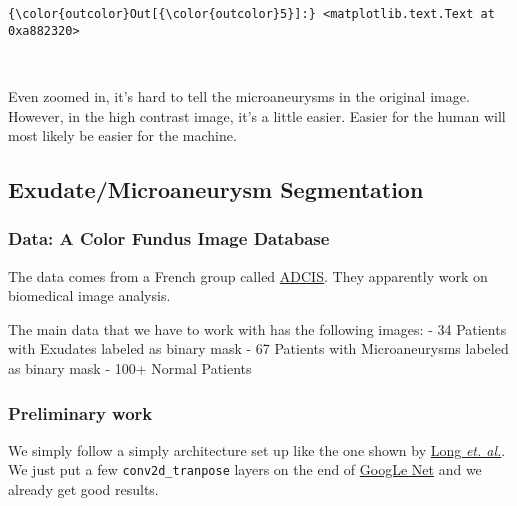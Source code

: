 \documentclass[11pt]{article}
\begin{document}
            \begin{Verbatim}[commandchars=\\\{\}]
{\color{outcolor}Out[{\color{outcolor}5}]:} <matplotlib.text.Text at 0xa882320>
\end{Verbatim}
        
    \begin{center}
    \end{center}
    { \hspace*{\fill} \\}
    
    Even zoomed in, it's hard to tell the microaneurysms in the original
image. However, in the high contrast image, it's a little easier. Easier
for the human will most likely be easier for the machine.

    \subsection{Exudate/Microaneurysm
Segmentation}\label{exudatemicroaneurysm-segmentation}

\subsubsection{Data: A Color Fundus Image
Database}\label{data-a-color-fundus-image-database}

The data comes from a French group called
\href{http://www.adcis.net/en/Download-Third-Party/E-Ophtha.html}{ADCIS}.
They apparently work on biomedical image analysis.

The main data that we have to work with has the following images: - 34
Patients with Exudates labeled as binary mask - 67 Patients with
Microaneurysms labeled as binary mask - 100+ Normal Patients

    \subsubsection{Preliminary work}\label{preliminary-work}

    We simply follow a simply architecture set up like the one shown by
\href{https://people.eecs.berkeley.edu/~jonlong/long_shelhamer_fcn.pdf}{Long
\emph{et. al.}}. We just put a few \texttt{conv2d\_tranpose} layers on
the end of
\href{http://www.cv-foundation.org/openaccess/content_cvpr_2015/papers/Szegedy_Going_Deeper_With_2015_CVPR_paper.pdf}{GoogLe
Net} and we already get good results.
\end{document}
